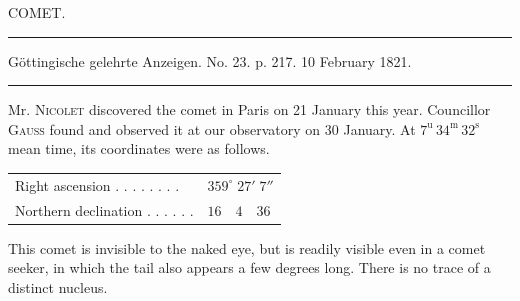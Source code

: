 \clearpage
{}
\hypertarget{native-440-part-lower}{}
\begin{center}
{\large COMET.}
\end{center}

\begin{center}
\noindent\rule{\linewidth}{0.4pt}

Göttingische gelehrte Anzeigen. No. 23. p. 217. 10 February 1821.

\noindent\rule{\linewidth}{0.4pt}
\end{center}

Mr. \textsc{Nicolet} discovered the comet in Paris on 21 January this year. Councillor \textsc{Gauss} found and observed it at our observatory on 30 January. At $7^{\mathrm{u}}\,34^{\mathrm{m}}\,32^{\mathrm{s}}$ mean time, its coordinates were as follows.

\begin{center}
\begin{tabular}{ll}
Right ascension . . . . . . . . & $359^\circ\;27'\;7''$ \\
Northern declination . . . . . . & $16\quad4\quad36$ \\
\end{tabular}
\end{center}

This comet is invisible to the naked eye, but is readily visible even in a comet seeker, in which the tail also appears a few degrees long. There is no trace of a distinct nucleus.
